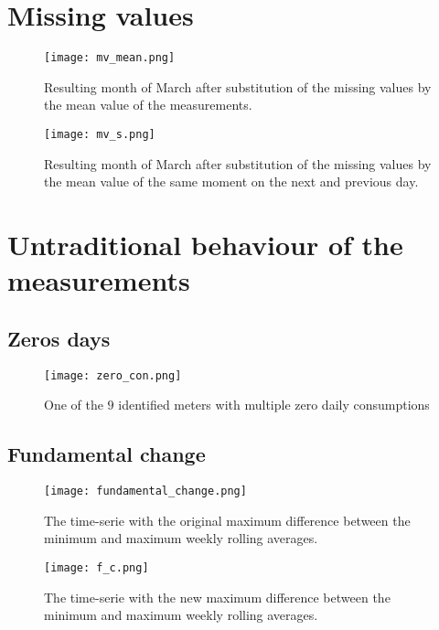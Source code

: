 \section{Missing values}

\begin{figure}[h!]
	\centering
	\texttt{[image: mv\_mean.png]}
	\caption{Resulting month of March after substitution of the missing values by the mean value of the measurements. }
	\label{fig:mv_mean}
\end{figure}

\begin{figure}[h!]
	\centering
	\texttt{[image: mv\_s.png]}
	\caption{Resulting month of March after substitution of the missing values by the mean value of the same moment on the next and previous day.}
	\label{fig:mv_s}
\end{figure}

\section{Untraditional behaviour of the measurements}

\subsection{Zeros days}
\begin{figure}[h!]
	\centering
	\texttt{[image: zero\_con.png]}
	\caption{One of the $9$ identified meters with multiple zero daily consumptions}
	\label{fig:zero_con}
\end{figure}


\subsection{Fundamental change}

\begin{figure}[h!]
	\centering
	\texttt{[image: fundamental\_change.png]}
	\caption{The time-serie with the original maximum difference between the minimum and maximum weekly rolling averages.}
	\label{fig:fundamental_change}
\end{figure}

\begin{figure}[h!]
	\centering
	\texttt{[image: f\_c.png]}
	\caption{The time-serie with the new maximum difference between the minimum and maximum weekly rolling averages.}
	\label{fig:f_c}
\end{figure}



